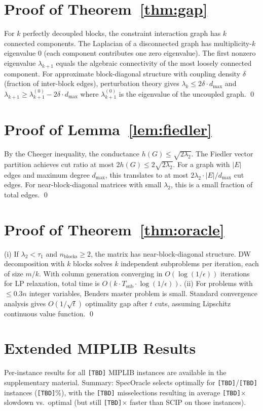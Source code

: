 \documentclass[11pt]{article}
\begin{document}
\appendix
\section{Proof of Theorem~\ref{thm:gap}}
For $k$ perfectly decoupled blocks, the constraint interaction graph has $k$ connected components. The Laplacian of a disconnected graph has multiplicity-$k$ eigenvalue 0 (each component contributes one zero eigenvalue). The first nonzero eigenvalue $\lambda_{k+1}$ equals the algebraic connectivity of the most loosely connected component. For approximate block-diagonal structure with coupling density $\delta$ (fraction of inter-block edges), perturbation theory gives $\lambda_k \leq 2\delta \cdot d_{\max}$ and $\lambda_{k+1} \geq \lambda_{k+1}^{(0)} - 2\delta \cdot d_{\max}$ where $\lambda_{k+1}^{(0)}$ is the eigenvalue of the uncoupled graph. \qed

\section{Proof of Lemma~\ref{lem:fiedler}}
By the Cheeger inequality, the conductance $h(G) \leq \sqrt{2\lambda_2}$. The Fiedler vector partition achieves cut ratio at most $2h(G) \leq 2\sqrt{2\lambda_2}$. For a graph with $|E|$ edges and maximum degree $d_{\max}$, this translates to at most $2\lambda_2 \cdot |E|/d_{\max}$ cut edges. For near-block-diagonal matrices with small $\lambda_2$, this is a small fraction of total edges. \qed

\section{Proof of Theorem~\ref{thm:oracle}}
(i) If $\lambda_2 < \tau_1$ and $n_{\text{blocks}} \geq 2$, the matrix has near-block-diagonal structure. DW decomposition with $k$ blocks solves $k$ independent subproblems per iteration, each of size $m/k$. With column generation converging in $O(\log(1/\epsilon))$ iterations for LP relaxation, total time is $O(k \cdot T_{\text{sub}} \cdot \log(1/\epsilon))$. (ii) For problems with $\leq 0.3n$ integer variables, Benders master problem is small. Standard convergence analysis gives $O(1/\sqrt{t})$ optimality gap after $t$ cuts, assuming Lipschitz continuous value function. \qed

\section{Extended MIPLIB Results}
Per-instance results for all \texttt{[TBD]} MIPLIB instances are available in the supplementary material. Summary: SpecOracle selects optimally for \texttt{[TBD]}/\texttt{[TBD]} instances (\texttt{[TBD]}\%), with the \texttt{[TBD]} misselections resulting in average \texttt{[TBD]}$\times$ slowdown vs.\ optimal (but still \texttt{[TBD]}$\times$ faster than SCIP on those instances).
\end{document}
